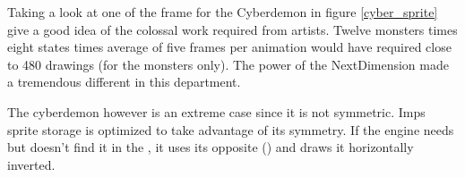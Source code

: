 \par
Taking a look at one of the frame for the Cyberdemon in figure \ref{cyber_sprite} give a good idea of the colossal work required from artists. Twelve monsters times eight states times average of five frames per animation would have required close to 480 drawings (for the monsters only). The power of the NextDimension made a tremendous different in this department.\\
\par
The cyberdemon however is an extreme case since it is not symmetric. Imps sprite storage is optimized to take advantage of its symmetry. If the engine needs  but doesn't find it in the , it uses its opposite () and draws it horizontally inverted.\\ 
\par
{}




\begin{figure}[H] \centering
{}
\end{figure}
\par
{}\\
\par 
{}






